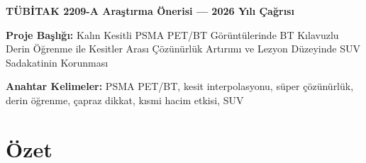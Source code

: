 \documentclass[11pt,a4paper]{article}
\begin{document}
\begin{center}
  {\Large\bfseries TÜBİTAK 2209-A Araştırma Önerisi --- 2026 Yılı Çağrısı\par}
\end{center}

\textbf{Proje Başlığı:} Kalın Kesitli PSMA PET/BT Görüntülerinde BT Kılavuzlu Derin Öğrenme ile
Kesitler Arası Çözünürlük Artırımı ve Lezyon Düzeyinde SUV Sadakatinin Korunması

\textbf{Anahtar Kelimeler:} PSMA PET/BT, kesit interpolasyonu, süper çözünürlük, derin öğrenme,
çapraz dikkat, kısmi hacim etkisi, SUV

\section*{Özet}
\end{document}
